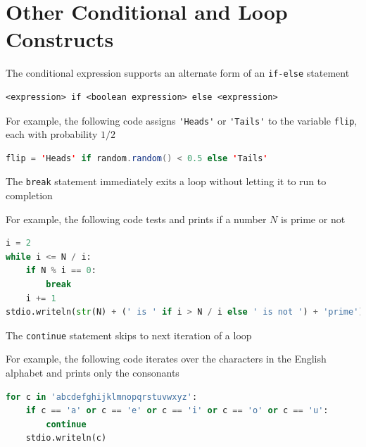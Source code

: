 \documentclass[8pt,a4paper,compress]{beamer}
\begin{document}
\section{Other Conditional and Loop Constructs}
\begin{frame}[fragile]
\pause

The conditional expression supports an alternate form of an \lstinline$if-else$ statement
 
\begin{lstlisting}[language={}]
<expression> if <boolean expression> else <expression>
\end{lstlisting}

For example, the following code assigns \lstinline{'Heads'} or \lstinline{'Tails'} to the variable \lstinline{flip}, each with probability $1/2$

\begin{lstlisting}[language=Java]
flip = 'Heads' if random.random() < 0.5 else 'Tails'
\end{lstlisting}

\pause
\bigskip

The \lstinline{break} statement immediately exits a loop without letting it to run to completion

\pause
\bigskip

For example, the following code tests and prints if a number $N$ is prime or not
\begin{lstlisting}[language=Python]
i = 2
while i <= N / i:
    if N % i == 0:
        break
    i += 1
stdio.writeln(str(N) + (' is ' if i > N / i else ' is not ') + 'prime')
\end{lstlisting}

\pause
\bigskip

The \lstinline{continue} statement skips to next iteration of a loop

\pause
\bigskip

For example, the following code iterates over the characters in the English alphabet and prints only the consonants
\begin{lstlisting}[language=Python]
for c in 'abcdefghijklmnopqrstuvwxyz':
    if c == 'a' or c == 'e' or c == 'i' or c == 'o' or c == 'u':
        continue
    stdio.writeln(c)
\end{lstlisting}
\end{frame}
\end{document}
